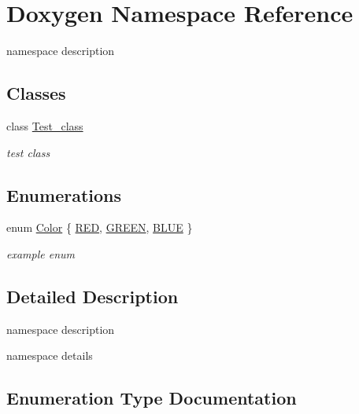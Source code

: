 \hypertarget{namespace_doxygen}{}\section{Doxygen Namespace Reference}
\label{namespace_doxygen}


namespace description  


\subsection*{Classes}
\begin{DoxyCompactItemize}
\item 
class \hyperlink{class_doxygen_1_1_test__class}{Test\+\_\+class}
\begin{DoxyCompactList}\small\item\em test class \end{DoxyCompactList}\end{DoxyCompactItemize}
\subsection*{Enumerations}
\begin{DoxyCompactItemize}
\item 
enum \hyperlink{namespace_doxygen_a3d6a73dba298d249eaa7668fbe7393eb}{Color} \{ \hyperlink{namespace_doxygen_a3d6a73dba298d249eaa7668fbe7393eba4613f7d44ebb8b6f738263a359a824d1}{R\+ED}, 
\hyperlink{namespace_doxygen_a3d6a73dba298d249eaa7668fbe7393eba81ad7cb02360c6115a9a898186b43da4}{G\+R\+E\+EN}, 
\hyperlink{namespace_doxygen_a3d6a73dba298d249eaa7668fbe7393ebafd5a47cfd507d19cde308e3a44c36347}{B\+L\+UE}
 \}\begin{DoxyCompactList}\small\item\em example enum \end{DoxyCompactList}
\end{DoxyCompactItemize}


\subsection{Detailed Description}
namespace description 

namespace details 

\subsection{Enumeration Type Documentation}
\hypertarget{namespace_doxygen_a3d6a73dba298d249eaa7668fbe7393eb}{}\label{namespace_doxygen_a3d6a73dba298d249eaa7668fbe7393eb} 

